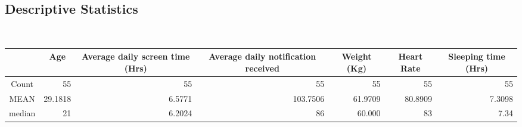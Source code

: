 \subsection*{Descriptive Statistics}\\
\begin{table}[H]
    \begin{adjustbox}{width = \textwidth, center}
        \begin{tabular}{|c|rrrrrr|}
            \hline
            \multicolumn{1}{|l|}{}                                                       & \multicolumn{1}{c|}{\cellcolor[HTML]{FFE599}Age}                & \multicolumn{1}{c|}{\cellcolor[HTML]{FFE599}Average daily screen time (Hrs)} & \multicolumn{1}{c|}{\cellcolor[HTML]{FFE599}Average daily notification received} & \multicolumn{1}{c|}{\cellcolor[HTML]{FFE599}Weight (Kg)} & \multicolumn{1}{c|}{\cellcolor[HTML]{FFE599}Heart Rate} & \multicolumn{1}{c|}{\cellcolor[HTML]{FFE599}Sleeping time (Hrs)} \\ \hline
            \cellcolor[HTML]{FFFF00}Count                                                & \multicolumn{1}{r|}{55}                                         & \multicolumn{1}{r|}{55}                                                      & \multicolumn{1}{r|}{55}                                                          & \multicolumn{1}{r|}{55}                                  & \multicolumn{1}{r|}{55}                                 & 55                                                               \\ \hline
            \cellcolor[HTML]{B6D7A8}MEAN                                                 & \multicolumn{1}{r|}{29.1818}                                    & \multicolumn{1}{r|}{6.5771}                                                  & \multicolumn{1}{r|}{103.7506}                                                    & \multicolumn{1}{r|}{61.9709}                             & \multicolumn{1}{r|}{80.8909}                            & 7.3098                                                           \\ \hline
            \cellcolor[HTML]{B6D7A8}median                                               & \multicolumn{1}{r|}{21}                                         & \multicolumn{1}{r|}{6.2024}                                                  & \multicolumn{1}{r|}{86}                                                          & \multicolumn{1}{r|}{60.000}                              & \multicolumn{1}{r|}{83}                                 & 7.34                                                             \\ \hline

\end{tabular}
\end{adjustbox}
\end{table}
